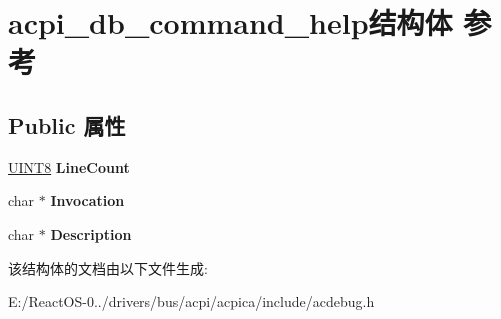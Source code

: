 \hypertarget{structacpi__db__command__help}{}\section{acpi\+\_\+db\+\_\+command\+\_\+help结构体 参考}
\label{structacpi__db__command__help}
\subsection*{Public 属性}
\begin{DoxyCompactItemize}
\item 
\mbox{\label{structacpi__db__command__help_a2888504a771ab81ab245cfaa13496b54}} 
\hyperlink{_processor_bind_8h_ab27e9918b538ce9d8ca692479b375b6a}{U\+I\+N\+T8} {\bfseries Line\+Count}
\item 
\mbox{\label{structacpi__db__command__help_a1082128108d3f7d4c5d8afdf7544188a}} 
char $\ast$ {\bfseries Invocation}
\item 
\mbox{\label{structacpi__db__command__help_ad27f1f3a20fc08c5fa2932483afebae9}} 
char $\ast$ {\bfseries Description}
\end{DoxyCompactItemize}


该结构体的文档由以下文件生成\+:\begin{DoxyCompactItemize}
\item 
E\+:/\+React\+O\+S-\/0../drivers/bus/acpi/acpica/include/acdebug.\+h\end{DoxyCompactItemize}

